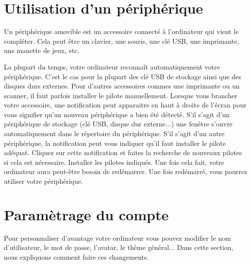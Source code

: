 \documentclass[12pt]{book}
\begin{document}
\section{Utilisation d'un périphérique}
	Un périphérique amovible est un accessoire connecté à l'ordinateur qui vient le compléter.
	Cela peut être un clavier, une souris, une clé USB, une imprimante, une manette de jeux, etc.\par
	La plupart du temps, votre ordinateur reconnaît automatiquement votre périphérique.
	C'est le cas pour la plupart des clé USB de stockage ainsi que des disques durs externes.
	Pour d'autres accessoires commes une imprimante ou un scanner, il faut parfois installer le pilote manuellement.
	Lorsque vous brancher votre accessoire, une notification peut apparaitre en haut à droite de l'écran pour vous signifier qu'un nouveau périphérique a bien été détecté.
	S'il s'agit d'un périphérique de stockage (clé USB, disque dur externe...) une fenêtre s'ouvre automatiquement dans le répertoire du périphérique.
	S'il s'agit d'un autre périphérique, la notification peut vous indiquer qu'il faut installer le pilote adéquat.
	Cliquez sur cette notification et faites la recherche de nouveaux pilotes si cela est nécessaire.
	Installer les pilotes indiqués.
	Une fois cela fait, votre ordinateur aura peut-être besoin de redémarrer.
	Une fois redémarré, vous pourrez utiliser votre périphérique.
\section{Paramètrage du compte}
	Pour personnaliser d'avantage votre ordinateur vous pouvez modifier le nom d'utilisateur, le mot de passe, l'avatar, le thème général...
	Dans cette section, nous expliquons comment faire ces changements.
\end{document}
